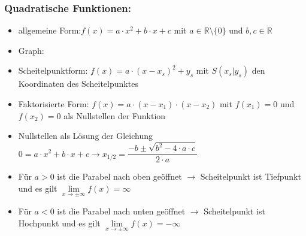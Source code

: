 \documentclass[a4paper,twocolumn,10pt]{onepgnote1}
\begin{document}
\subsubsection{Quadratische Funktionen:}
\begin{itemize}
\item allgemeine Form:$f(x) = a\cdot x^2 + b\cdot x +c$ mit $a\in \mathds{R}\setminus \{0\}$ und $b, c \in \mathds{R}$
\item Graph: 
\item Scheitelpunktform: $f(x) = a\cdot(x-x_s)^2 +y_s$ mit $S(x_s|y_s)$ den Koordinaten des Scheitelpunktes
\item Faktorisierte Form: $f(x)= a\cdot (x-x_1)\cdot (x-x_2)$ mit $f(x_1)= 0$ und $f(x_2)= 0$ als Nullstellen der Funktion
\item Nullstellen als Lösung der Gleichung\\ $0 =a\cdot x^2 + b\cdot x +c \longrightarrow x_{1/2} = \dfrac{-b\pm\sqrt{b^2-4\cdot a\cdot c}}{2\cdot a}$
\item Für $a>0$ ist die Parabel nach oben geöffnet $\longrightarrow$ Scheitelpunkt ist Tiefpunkt und es gilt $
\lim\limits_{x \to \pm\infty} f(x) = \infty$
\item Für $a<0$ ist die Parabel nach unten geöffnet $\longrightarrow$ Scheitelpunkt ist Hochpunkt und es gilt $
\lim\limits_{x \to \pm\infty} f(x) = -\infty$\\[0.15cm]
\end{itemize}
\end{document}
